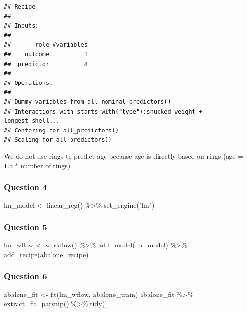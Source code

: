 \documentclass[
]{article}
\newenvironment{Shaded}{\begin{snugshade}}{\end{snugshade}}
\newcommand{\FunctionTok}[1]{\textcolor[rgb]{0.00,0.00,0.00}{#1}}
\newcommand{\NormalTok}[1]{#1}
\newcommand{\OtherTok}[1]{\textcolor[rgb]{0.56,0.35,0.01}{#1}}
\newcommand{\SpecialCharTok}[1]{\textcolor[rgb]{0.00,0.00,0.00}{#1}}
\newcommand{\StringTok}[1]{\textcolor[rgb]{0.31,0.60,0.02}{#1}}
\begin{document}
\begin{verbatim}
## Recipe
## 
## Inputs:
## 
##       role #variables
##    outcome          1
##  predictor          8
## 
## Operations:
## 
## Dummy variables from all_nominal_predictors()
## Interactions with starts_with("type"):shucked_weight + longest_shell...
## Centering for all_predictors()
## Scaling for all_predictors()
\end{verbatim}

We do not use rings to predict age because age is directly based on
rings (age = 1.5 * number of rings).

\hypertarget{question-4}{%
\subsubsection{Question 4}\label{question-4}}

\begin{Shaded}
\begin{Highlighting}[]
\NormalTok{lm\_model }\OtherTok{\textless{}{-}} \FunctionTok{linear\_reg}\NormalTok{() }\SpecialCharTok{\%\textgreater{}\%} 
  \FunctionTok{set\_engine}\NormalTok{(}\StringTok{"lm"}\NormalTok{)}
\end{Highlighting}
\end{Shaded}

\hypertarget{question-5}{%
\subsubsection{Question 5}\label{question-5}}

\begin{Shaded}
\begin{Highlighting}[]
\NormalTok{lm\_wflow }\OtherTok{\textless{}{-}} \FunctionTok{workflow}\NormalTok{() }\SpecialCharTok{\%\textgreater{}\%} 
  \FunctionTok{add\_model}\NormalTok{(lm\_model) }\SpecialCharTok{\%\textgreater{}\%} 
  \FunctionTok{add\_recipe}\NormalTok{(abalone\_recipe)}
\end{Highlighting}
\end{Shaded}

\hypertarget{question-6}{%
\subsubsection{Question 6}\label{question-6}}

\begin{Shaded}
\begin{Highlighting}[]
\NormalTok{abalone\_fit }\OtherTok{\textless{}{-}} \FunctionTok{fit}\NormalTok{(lm\_wflow, abalone\_train)}
\NormalTok{abalone\_fit }\SpecialCharTok{\%\textgreater{}\%} \FunctionTok{extract\_fit\_parsnip}\NormalTok{() }\SpecialCharTok{\%\textgreater{}\%} \FunctionTok{tidy}\NormalTok{()}
\end{Highlighting}
\end{Shaded}
\end{document}
